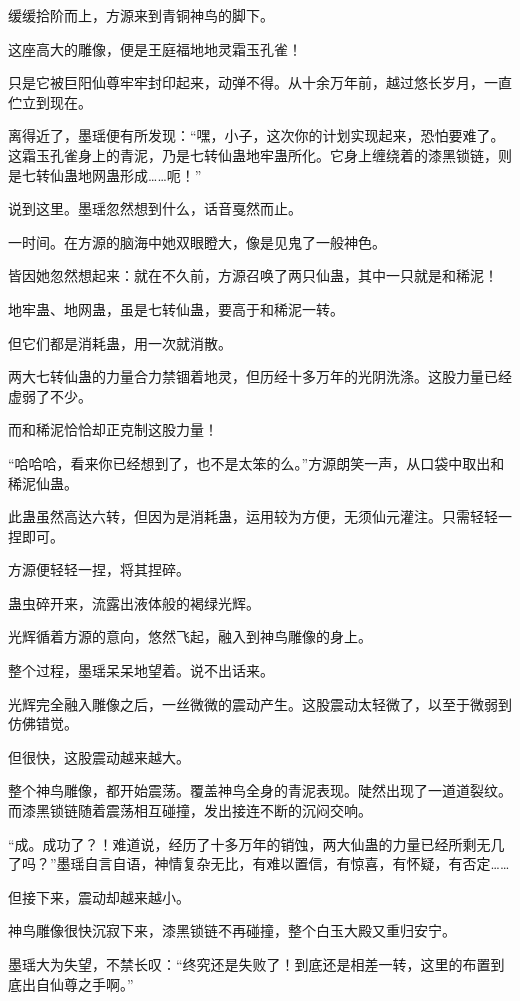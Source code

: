 \begin{this_body}
缓缓拾阶而上，方源来到青铜神鸟的脚下。

这座高大的雕像，便是王庭福地地灵霜玉孔雀！

只是它被巨阳仙尊牢牢封印起来，动弹不得。从十余万年前，越过悠长岁月，一直伫立到现在。

离得近了，墨瑶便有所发现：“嘿，小子，这次你的计划实现起来，恐怕要难了。这霜玉孔雀身上的青泥，乃是七转仙蛊地牢蛊所化。它身上缠绕着的漆黑锁链，则是七转仙蛊地网蛊形成……呃！”

说到这里。墨瑶忽然想到什么，话音戛然而止。

一时间。在方源的脑海中她双眼瞪大，像是见鬼了一般神色。

皆因她忽然想起来：就在不久前，方源召唤了两只仙蛊，其中一只就是和稀泥！

地牢蛊、地网蛊，虽是七转仙蛊，要高于和稀泥一转。

但它们都是消耗蛊，用一次就消散。

两大七转仙蛊的力量合力禁锢着地灵，但历经十多万年的光阴洗涤。这股力量已经虚弱了不少。

而和稀泥恰恰却正克制这股力量！

“哈哈哈，看来你已经想到了，也不是太笨的么。”方源朗笑一声，从口袋中取出和稀泥仙蛊。

此蛊虽然高达六转，但因为是消耗蛊，运用较为方便，无须仙元灌注。只需轻轻一捏即可。

方源便轻轻一捏，将其捏碎。

蛊虫碎开来，流露出液体般的褐绿光辉。

光辉循着方源的意向，悠然飞起，融入到神鸟雕像的身上。

整个过程，墨瑶呆呆地望着。说不出话来。

光辉完全融入雕像之后，一丝微微的震动产生。这股震动太轻微了，以至于微弱到仿佛错觉。

但很快，这股震动越来越大。

整个神鸟雕像，都开始震荡。覆盖神鸟全身的青泥表现。陡然出现了一道道裂纹。而漆黑锁链随着震荡相互碰撞，发出接连不断的沉闷交响。

“成。成功了？！难道说，经历了十多万年的销蚀，两大仙蛊的力量已经所剩无几了吗？”墨瑶自言自语，神情复杂无比，有难以置信，有惊喜，有怀疑，有否定……

但接下来，震动却越来越小。

神鸟雕像很快沉寂下来，漆黑锁链不再碰撞，整个白玉大殿又重归安宁。

墨瑶大为失望，不禁长叹：“终究还是失败了！到底还是相差一转，这里的布置到底出自仙尊之手啊。”


\end{this_body}
